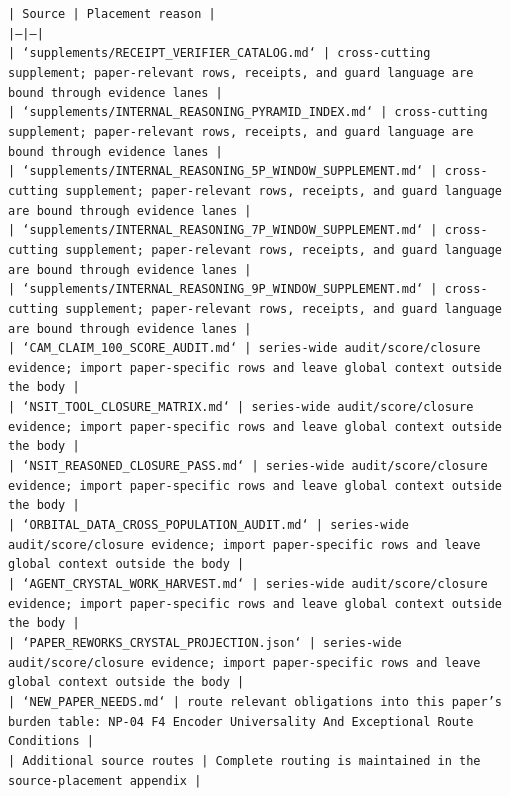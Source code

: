\documentclass[11pt]{article}
\begin{document}
\noindent\texttt{| Source | Placement reason |}\\
\noindent\texttt{|---|---|}\\
\noindent\texttt{| `supplements/RECEIPT\_VERIFIER\_CATALOG.md` | cross-cutting supplement; paper-relevant rows, receipts, and guard language are bound through evidence lanes |}\\
\noindent\texttt{| `supplements/INTERNAL\_REASONING\_PYRAMID\_INDEX.md` | cross-cutting supplement; paper-relevant rows, receipts, and guard language are bound through evidence lanes |}\\
\noindent\texttt{| `supplements/INTERNAL\_REASONING\_5P\_WINDOW\_SUPPLEMENT.md` | cross-cutting supplement; paper-relevant rows, receipts, and guard language are bound through evidence lanes |}\\
\noindent\texttt{| `supplements/INTERNAL\_REASONING\_7P\_WINDOW\_SUPPLEMENT.md` | cross-cutting supplement; paper-relevant rows, receipts, and guard language are bound through evidence lanes |}\\
\noindent\texttt{| `supplements/INTERNAL\_REASONING\_9P\_WINDOW\_SUPPLEMENT.md` | cross-cutting supplement; paper-relevant rows, receipts, and guard language are bound through evidence lanes |}\\
\noindent\texttt{| `CAM\_CLAIM\_100\_SCORE\_AUDIT.md` | series-wide audit/score/closure evidence; import paper-specific rows and leave global context outside the body |}\\
\noindent\texttt{| `NSIT\_TOOL\_CLOSURE\_MATRIX.md` | series-wide audit/score/closure evidence; import paper-specific rows and leave global context outside the body |}\\
\noindent\texttt{| `NSIT\_REASONED\_CLOSURE\_PASS.md` | series-wide audit/score/closure evidence; import paper-specific rows and leave global context outside the body |}\\
\noindent\texttt{| `ORBITAL\_DATA\_CROSS\_POPULATION\_AUDIT.md` | series-wide audit/score/closure evidence; import paper-specific rows and leave global context outside the body |}\\
\noindent\texttt{| `AGENT\_CRYSTAL\_WORK\_HARVEST.md` | series-wide audit/score/closure evidence; import paper-specific rows and leave global context outside the body |}\\
\noindent\texttt{| `PAPER\_REWORKS\_CRYSTAL\_PROJECTION.json` | series-wide audit/score/closure evidence; import paper-specific rows and leave global context outside the body |}\\
\noindent\texttt{| `NEW\_PAPER\_NEEDS.md` | route relevant obligations into this paper's burden table: NP-04 F4 Encoder Universality And Exceptional Route Conditions |}\\
\noindent\texttt{| Additional source routes | Complete routing is maintained in the source-placement appendix |}\\
\end{document}
